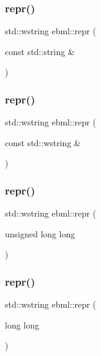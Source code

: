 \subsubsection{\texorpdfstring{repr()}{repr()}\hspace{0.1cm}{\footnotesize\ttfamily [4/10]}}
{\footnotesize\ttfamily std\+::wstring ebml\+::repr (\begin{DoxyParamCaption}\item[{const std\+::string \&}]{ }\end{DoxyParamCaption})}

\mbox{\label{namespaceebml_a69e4c6909c8a7fc69edd32e99ec8a490}} 
\subsubsection{\texorpdfstring{repr()}{repr()}\hspace{0.1cm}{\footnotesize\ttfamily [5/10]}}
{\footnotesize\ttfamily std\+::wstring ebml\+::repr (\begin{DoxyParamCaption}\item[{const std\+::wstring \&}]{ }\end{DoxyParamCaption})}

\mbox{\label{namespaceebml_a82cacdcda15dab54cb129baca549eb2f}} 
\subsubsection{\texorpdfstring{repr()}{repr()}\hspace{0.1cm}{\footnotesize\ttfamily [6/10]}}
{\footnotesize\ttfamily std\+::wstring ebml\+::repr (\begin{DoxyParamCaption}\item[{unsigned long}]{long }\end{DoxyParamCaption})}

\mbox{\label{namespaceebml_ae628d127f38ecd31687f54becab12c27}} 
\subsubsection{\texorpdfstring{repr()}{repr()}\hspace{0.1cm}{\footnotesize\ttfamily [7/10]}}
{\footnotesize\ttfamily std\+::wstring ebml\+::repr (\begin{DoxyParamCaption}\item[{long}]{long }\end{DoxyParamCaption})}


